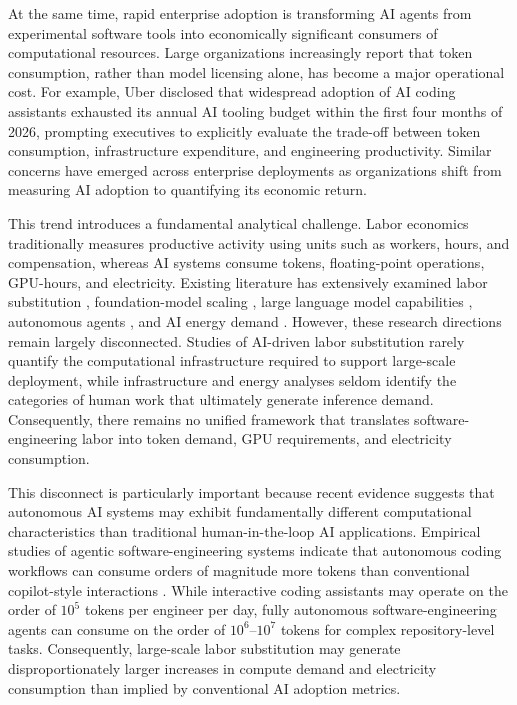 \documentclass{article}
\begin{document}
At the same time, rapid enterprise adoption is transforming AI agents from experimental software tools into economically significant consumers of computational resources. Large organizations increasingly report that token consumption, rather than model licensing alone, has become a major operational cost. For example, Uber disclosed that widespread adoption of AI coding assistants exhausted its annual AI tooling budget within the first four months of 2026, prompting executives to explicitly evaluate the trade-off between token consumption, infrastructure expenditure, and engineering productivity. Similar concerns have emerged across enterprise deployments as organizations shift from measuring AI adoption to quantifying its economic return.

This trend introduces a fundamental analytical challenge. Labor economics traditionally measures productive activity using units such as workers, hours, and compensation, whereas AI systems consume tokens, floating-point operations, GPU-hours, and electricity. Existing literature has extensively examined labor substitution \citep{autor2003skill, acemoglu2022tasks}, foundation-model scaling \citep{kaplan2020scaling, hoffmann2022chinchilla}, large language model capabilities \citep{brown2020gpt3, bommasani2021foundation}, autonomous agents \citep{wang2025agentic, patil2025bfcl, rothschild2025agentic}, and AI energy demand \citep{iea2025energyai, lbnl2024datacenterenergy}. However, these research directions remain largely disconnected. Studies of AI-driven labor substitution rarely quantify the computational infrastructure required to support large-scale deployment, while infrastructure and energy analyses seldom identify the categories of human work that ultimately generate inference demand. Consequently, there remains no unified framework that translates software-engineering labor into token demand, GPU requirements, and electricity consumption.

This disconnect is particularly important because recent evidence suggests that autonomous AI systems may exhibit fundamentally different computational characteristics than traditional human-in-the-loop AI applications. Empirical studies of agentic software-engineering systems indicate that autonomous coding workflows can consume orders of magnitude more tokens than conventional copilot-style interactions \citep{salim2026tokenomics, bai2026agent}. While interactive coding assistants may operate on the order of $10^5$ tokens per engineer per day, fully autonomous software-engineering agents can consume on the order of $10^6$--$10^7$ tokens for complex repository-level tasks. Consequently, large-scale labor substitution may generate disproportionately larger increases in compute demand and electricity consumption than implied by conventional AI adoption metrics.
\end{document}
